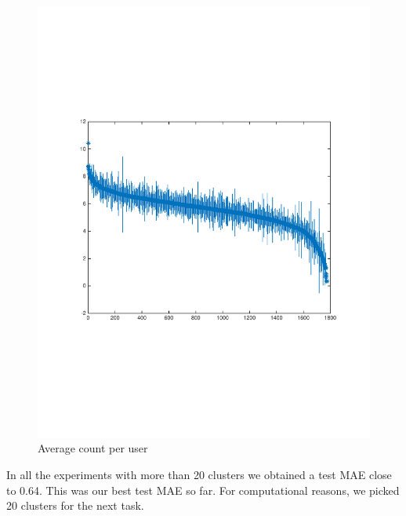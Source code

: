 \begin{figure}[h]
\begin{minipage}[b]{0.45\textwidth}
    \includegraphics[clip, trim=2cm 6.8cm 1.5cm 7cm, width=\textwidth]{figures/MeanStdCountPerUser.pdf}
    \caption{Average count per user}
    \label{fig:MeanStdCountPerUser}
    \vspace{2 mm}
  \end{minipage}
\end{figure}

In all the experiments with more than 20 clusters we obtained a test MAE close to 0.64. This was our best test MAE so far. For computational reasons, we picked 20 clusters for the next task.


